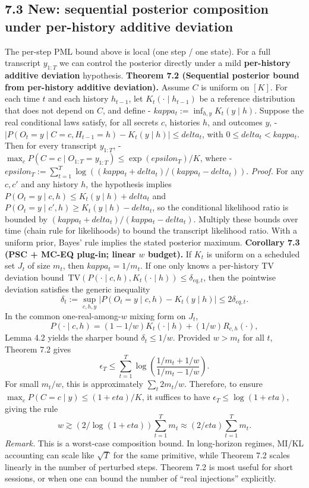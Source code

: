\documentclass[11pt]{article}
\begin{document}
\hypertarget{new-sequential-posterior-composition-under-per-history-additive-deviation}{%
\subsection{7.3 New: sequential posterior composition under per-history
additive
deviation}\label{new-sequential-posterior-composition-under-per-history-additive-deviation}}

The per-step PML bound above is local (one step / one state). For a full
transcript \(y_{1:T}\) we can control the posterior directly under a
mild \textbf{per-history additive deviation} hypothesis. \textbf{Theorem
7.2 (Sequential posterior bound from per-history additive deviation).}
Assume \(C\) is uniform on \([K]\). For each time \(t\) and each history
\(h_{t-1}\), let \(K_t(\cdot\mid h_{t-1})\) be a reference distribution
that does not depend on \(C\), and define -
\(kappa_t:= \inf_{h,y} K_t(y\mid h)\). Suppose the real conditional laws
satisfy, for all secrets \(c\), histories \(h\), and outcomes \(y\), -
\(|P(O_t=y\mid C=c, H_{t-1}=h) - K_t(y\mid h)| \le delta_t\), with
\(0 \le delta_t < kappa_t\). Then for every transcript \(y_{1:T}\), -
\(\max_c P(C=c\mid O_{1:T}=y_{1:T}) \le \exp(epsilon_T)/K\), where -
\(epsilon_T:= \sum_{t=1}^T \log((kappa_t+delta_t)/(kappa_t-delta_t))\).
\emph{Proof.} For any \(c,c'\) and any history \(h\), the hypothesis
implies \(P(O_t=y\mid c,h) \le K_t(y\mid h)+delta_t\) and
\(P(O_t=y\mid c',h) \ge K_t(y\mid h)-delta_t\), so the conditional
likelihood ratio is bounded by \((kappa_t+delta_t)/(kappa_t-delta_t)\).
Multiply these bounds over time (chain rule for likelihoods) to bound
the transcript likelihood ratio. With a uniform prior, Bayes' rule
implies the stated posterior maximum. \textbf{Corollary 7.3 (PSC + MC-EQ
plug-in; linear \(w\) budget).} If \(K_t\) is uniform on a scheduled set
\(J_t\) of size \(m_t\), then \(kappa_t = 1/m_t\). If one only knows a
per-history TV deviation bound
\(\,\mathrm{TV}(P(\cdot\mid c,h),K_t(\cdot\mid h))\le \delta_{eq,t}\),
then the pointwise deviation satisfies the generic inequality \[
\delta_t:= \sup_{c,h,y}\bigl|P(O_t=y\mid c,h)-K_t(y\mid h)\bigr| \le 2\delta_{eq,t}.
\] In the common one-real-among-\(w\) mixing form on \(J_t\), \[
P(\cdot\mid c,h)=(1-1/w)K_t(\cdot\mid h) + (1/w)R_{c,h}(\cdot),
\] Lemma 4.2 yields the sharper bound \(\delta_t\le 1/w\). Provided
\(w>m_t\) for all \(t\), Theorem 7.2 gives \[
\epsilon_T \le \sum_{t=1}^T \log\!\left(\frac{1/m_t+1/w}{1/m_t-1/w}\right).
\] For small \(m_t/w\), this is approximately \(\sum_t 2m_t/w\).
Therefore, to ensure \(\max_c P(C=c\mid y) \le (1+eta)/K\), it suffices
to have \(\epsilon_T \le \log(1+eta)\), giving the rule \[
w \gtrsim (2/\log(1+eta)) \sum_{t=1}^T m_t \approx (2/eta) \sum_{t=1}^T m_t.
\] \emph{Remark.} This is a worst-case composition bound. In
long-horizon regimes, MI/KL accounting can scale like \(\sqrt{T}\) for
the same primitive, while Theorem 7.2 scales linearly in the number of
perturbed steps. Theorem 7.2 is most useful for short sessions, or when
one can bound the number of ``real injections'' explicitly.
\end{document}
